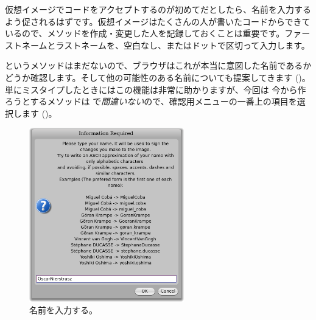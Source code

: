 \documentclass[a4paper,10pt,twoside]{book}
\begin{document}
仮想イメージでコードをアクセプトするのが初めてだとしたら、名前を入力するよう促されるはずです。仮想イメージはたくさんの人が書いたコードからできているので、メソッドを作成・変更した人を記録しておくことは重要です。ファーストネームとラストネームを、空白なし、またはドットで区切って入力します。


 というメソッドはまだないので、ブラウザはこれが本当に意図した名前であるかどうか確認します。そして他の可能性のある名前についても提案してきます ()。
単にミスタイプしたときにはこの機能は非常に助かりますが、今回は 今から作ろうとするメソッドは  で\emph{間違いない}ので、確認用メニューの一番上の項目を選択します ()。


\begin{figure}[htb]
\centerline {\includegraphics[width=0.6\textwidth]{name}}
\caption{名前を入力する。}
\end{figure}
\end{document}

